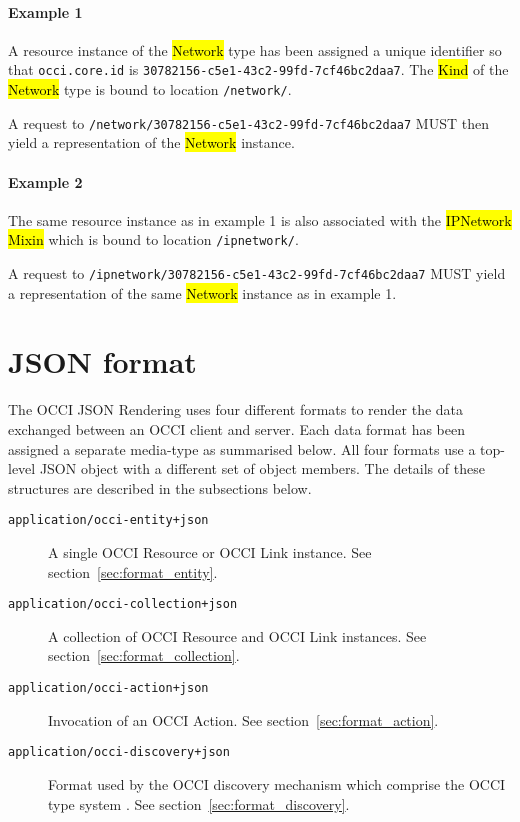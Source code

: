 \documentclass[10pt,a4paper]{article}
\begin{document}
\paragraph*{Example 1}
A resource instance of the \hl{Network} type has been assigned a unique identifier
so that {\tt occi.core.id} is {\tt 30782156-c5e1-43c2-99fd-7cf46bc2daa7}. The \hl{Kind} of
the \hl{Network} type is bound to location {\tt /network/}.

A request to {\tt /network/30782156-c5e1-43c2-99fd-7cf46bc2daa7} MUST then yield a
representation of the \hl{Network} instance.

\paragraph*{Example 2}
The same resource instance as in example 1 is also associated with the
\hl{IPNetwork} \hl{Mixin} which is bound to location {\tt /ipnetwork/}.

A request to {\tt /ipnetwork/30782156-c5e1-43c2-99fd-7cf46bc2daa7} MUST yield a
representation of the same \hl{Network} instance as in example 1.

\section{JSON format}
\label{sec:json_format}
The OCCI JSON Rendering uses four different formats to render the data
exchanged between an OCCI client and server.
Each data format has been assigned a separate media-type as summarised below.
All four formats use a top-level JSON object with a different set of object
members. The details of these structures are described in the subsections
below.
\begin{description}
\item[\tt application/occi-entity+json]
A single OCCI Resource or OCCI Link instance.
See section~\ref{sec:format_entity}.

\item[\tt application/occi-collection+json]
A collection of OCCI Resource and OCCI Link instances.
See section~\ref{sec:format_collection}.

\item[\tt application/occi-action+json]
Invocation of an OCCI Action.
See section~\ref{sec:format_action}.

\item[\tt application/occi-discovery+json]
Format used by the OCCI discovery mechanism which comprise the OCCI type system
\cite{occi:core}.
See section~\ref{sec:format_discovery}.
\end{description}
\end{document}
